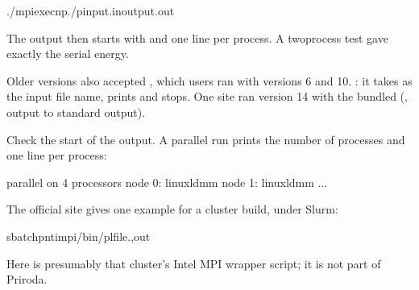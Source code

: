 \documentclass[letterpaper,10pt,english,openany,oneside]{sphinxmanual}
\begin{document}
\begin{sphinxVerbatim}[commandchars=\\\{\}]
./mpiexec\PYGZhy{}np./pinput.inoutput.out
\end{sphinxVerbatim}



\sphinxAtStartPar
The output then starts with  and one  line per process. A two\sphinxhyphen{}process test gave
exactly the serial energy.



\sphinxAtStartPar
Older versions also accepted , which users ran with versions 6 and 10. : it takes  as the input file name, prints  and stops. One site ran version 14 with
the bundled  (, output to standard output).



\sphinxAtStartPar
Check the start of the output. A parallel run prints the number of processes and one line per process:

\begin{sphinxVerbatim}[commandchars=\\\{\}]
 parallel on  4 processors
 node  0: \PYGZsq{}linux\PYGZhy{}ldmm\PYGZsq{}
 node  1: \PYGZsq{}linux\PYGZhy{}ldmm\PYGZsq{}
 ...
\end{sphinxVerbatim}



\sphinxAtStartPar
The official site gives one example for a cluster build,  under Slurm:

\begin{sphinxVerbatim}[commandchars=\\\{\}]
sbatch\PYGZhy{}p\PYGZhy{}n\PYGZhy{}timpi\PYGZti{}/bin/p\PYGZus{}lfile.,out
\end{sphinxVerbatim}

\sphinxAtStartPar
Here  is presumably that cluster’s Intel MPI wrapper script; it is not part of Priroda.
\end{document}
